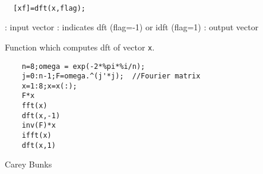 
\begin{mandesc}
   \\ %
\end{mandesc}
\begin{calling_sequence}
\begin{verbatim}
  [xf]=dft(x,flag);  
\end{verbatim}
\end{calling_sequence}
\begin{parameters}
  \begin{varlist}
    : input vector
    : indicates dft (flag=-1)  or idft (flag=1)
    : output vector
  \end{varlist}
\end{parameters}
\begin{mandescription}
  Function which computes dft of vector \verb!x!.
\end{mandescription}
\begin{examples}
  \begin{Verbatim}
    n=8;omega = exp(-2*%pi*%i/n);
    j=0:n-1;F=omega.^(j'*j);  //Fourier matrix
    x=1:8;x=x(:);
    F*x
    fft(x)
    dft(x,-1)
    inv(F)*x
    ifft(x)
    dft(x,1)
  \end{Verbatim}
\end{examples}
\begin{manseealso}
\end{manseealso}
\begin{authors}
    Carey Bunks  
\end{authors}
